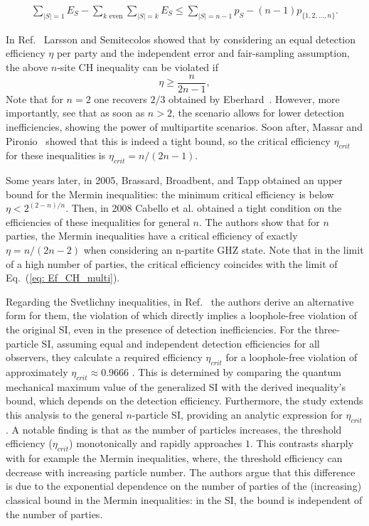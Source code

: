 \documentclass[aps,pra,reprint, superscriptaddress,showkeys]{revtex4-2}
\theoremstyle{plain}
\begin{document}
\begin{align}
\sum_{|S|=1} E_S - \sum_{k  \text{ even}} \sum_{|S|=k} E_S \le \sum_{|S|=n-1} p_S - (n-1) p_{\{1, 2, \dots, n\}}.
\end{align}

In Ref.~\cite{CH_n_sites} Larsson and  Semitecolos showed that by considering an equal detection efficiency $\eta$ per party and the independent error and fair-sampling assumption, the above $n$-site CH inequality can be violated if 
\begin{equation}
    \eta \geq\frac{n}{2n-1}, \label{eq: Ef_CH_multi}
\end{equation}
Note that  for $n=2$ one recovers $2/3$ obtained by Eberhard~\cite{Eberhard93}. However, more importantly, see that as soon as $n>2$, the scenario allows for lower detection inefficiencies, showing the power of  multipartite scenarios. Soon after, Massar and Pironio~\cite{Massar_Pironio_2003} showed that this is indeed a tight bound, so the critical efficiency $\eta_{crit}$ for these inequalities is  $\eta_{crit} = n/(2n-1)$.

Some years later,  in 2005, Brassard, Broadbent, and Tapp obtained an upper bound for the Mermin inequalities: the minimum critical efficiency is below $\eta <2^{(2-n)/n}$\cite{A_Broadbent_Mermin}. Then, in 2008 Cabello et al. \cite{Cabello_Mermin} obtained a tight condition on the efficiencies of these inequalities for general $n$. The authors show that for $n$ parties, the Mermin inequalities have a critical efficiency of exactly $\eta = n/(2n-2)$ when considering an n-partite GHZ state.  Note that in the limit of a high number of parties, the critical efficiency coincides with the limit of Eq.~(\ref{eq: Ef_CH_multi}).

Regarding the Svetlichny inequalities, in Ref.~\cite{Svet_ineqs_ineff} the authors derive an alternative form for them, the violation of which directly implies a loophole-free violation of the original SI, even in the presence of detection inefficiencies. For the three-particle SI, assuming equal and independent detection efficiencies for all observers, they calculate a required efficiency $\eta_{crit}$  for a loophole-free violation of approximately $\eta_{crit} \approx 0.9666$ . This is determined by comparing the quantum mechanical maximum value of the generalized SI with the derived inequality's bound, which depends on the detection efficiency. Furthermore, the study extends this analysis to the general $n$-particle SI, providing an analytic expression for $\eta_{crit}$. A notable finding is that as the number of particles increases, the threshold efficiency ($\eta_{crit}$) monotonically and rapidly approaches $1$. This contrasts sharply with for example the Mermin inequalities, where,   the threshold efficiency can decrease with increasing particle number. The authors argue that this difference is due to the exponential dependence on the number of parties of the (increasing) classical bound in the Mermin inequalities: in the SI, the bound is independent of the number of parties. 
\end{document}
